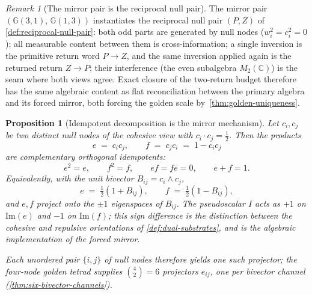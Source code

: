 \documentclass[11pt,a4paper]{article}
\theoremstyle{plain}
\newtheorem{proposition}[theorem]{Proposition}
\theoremstyle{definition}
\theoremstyle{remark}
\newtheorem{remark}[theorem]{Remark}
\numberwithin{equation}{section}
\newcommand{\Cl}{\mathbb{G}}
\begin{document}
\begin{remark}[The mirror pair is the reciprocal null pair]
\label{rmk:mirror-is-reciprocal-null-pair}
The mirror pair \((\Cl(3,1),\,\Cl(1,3))\) instantiates the reciprocal
null pair \((P,Z)\) of \cref{def:reciprocal-null-pair}: both odd parts are
generated by null nodes (\(w_i^2=c_i^2=0\)); all measurable content
between them is cross-information; a single inversion is the primitive
return word \(P\to Z\), and the same inversion applied again is the
returned return \(Z\to P\); their interference (the even subalgebra
\(M_2(\mathbb{C})\)) is the seam where both views agree.  Exact closure
of the two-return budget therefore has the same algebraic content as
flat reconciliation between the primary algebra and its forced mirror,
both forcing the golden scale by~\cref{thm:golden-uniqueness}.
\end{remark}

\begin{proposition}[Idempotent decomposition is the mirror mechanism]
\label{prop:idempotent-mirror}
Let \(c_i,c_j\) be two distinct null nodes of the cohesive view with
\(c_i\cdot c_j=\tfrac12\).  Then the products
\[
  e \;=\; c_ic_j, \qquad f \;=\; c_jc_i \;=\; 1-c_ic_j
\]
are complementary orthogonal idempotents:
\[
  e^2=e,\qquad f^2=f,\qquad ef=fe=0,\qquad e+f=1.
\]
Equivalently, with the unit bivector \(B_{ij}=c_i\wedge c_j\),
\[
  e \;=\; \tfrac12(1+B_{ij}), \qquad f \;=\; \tfrac12(1-B_{ij}),
\]
and \(e,f\) project onto the \(\pm1\) eigenspaces of \(B_{ij}\).  The
pseudoscalar \(I\) acts as \(+1\) on \(\mathrm{Im}(e)\) and \(-1\) on
\(\mathrm{Im}(f)\); this sign difference is the distinction between the
cohesive and repulsive orientations of \cref{def:dual-substrates}, and
is the algebraic implementation of the forced mirror.

Each unordered pair \(\{i,j\}\) of null nodes therefore yields one such
projector; the four-node golden tetrad supplies \(\binom{4}{2}=6\)
projectors \(e_{ij}\), one per bivector channel
(\cref{thm:six-bivector-channels}).
\end{proposition}
\end{document}
